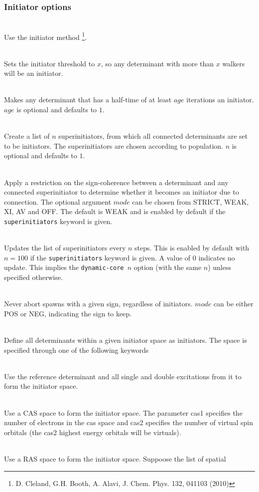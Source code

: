 \documentclass[a4paper,notitlepage]{scrreprt}
\newcommand\codeitem[1]{\needspace{1.5\baselineskip}\item[\textnormal{\ttfamily #1 \nopagebreak}] \hfill \\ \nopagebreak}
\begin{document}
  \subsubsection{Initiator options}
  \begin{description}
    \codeitem{truncinitiator}
    Use the initiator method \footnote{D. Cleland, G.H. Booth, A. Alavi,
      J. Chem. Phys. 132, 041103 (2010)}.
    \codeitem{addtoinitiator $x$}
    Sets the initiator threshold to $x$, so any determinant with more than $x$
    walkers will be an initiator.
    \codeitem{senior-initiators $age$}
    Makes any determinant that has a half-time of at least $age$ iterations an
    initiator. $age$ is optional and defaults to $1$.
    \codeitem{superinitiator $n$}
    Create a list of $n$ superinitiators, from which all connected
    determinants are set to be initiators. The superinitiators are chosen
    according to population. $n$ is optional and defaults to $1$. 
    \codeitem{coherent-superinitiators $mode$}
    Apply a restriction on the sign-coherence between a determinant and any
    connected superinitiator to determine whether it becomes an initiator due
    to connection. The optional argument $mode$ can be chosen from STRICT,
    WEAK, XI, AV and OFF. The default is WEAK and is enabled by default if the
    \texttt{superinitiators} keyword is given.
    \codeitem{dynamic-superinitiators $n$}
    Updates the list of superinitiators every $n$ steps. This is enabled by default with
    $n=100$ if the \texttt{superinitiators} keyword is given. A value of 0
    indicates no update. This implies the \texttt{dynamic-core $n$} option
    (with the same $n$) unless specified otherwise.
    \codeitem{allow-signed-spawns $mode$}
    Never abort spawns with a given sign, regardless of initiators. $mode$ can
    be either POS or NEG, indicating the sign to keep.
    \codeitem{initiator-space}
    Define all determinants within a given initiator space as initiators. The
    space is specified through one of the following keywords
    \begin{description}
      \codeitem{doubles-initiator}
    Use the reference determinant and all single and double excitations
    from it to form the initiator space.
    \codeitem{cas-initiator cas1 cas2}
    Use a CAS space to form the initiator space. The parameter cas1 specifies
    the number of electrons in the cas space and cas2 specifies the
    number of virtual spin orbitals (the cas2 highest energy orbitals
    will be virtuals).
    \codeitem{ras-initiator ras1 ras2 ras3 ras4 ras5}
    Use a RAS space to form the initiator space. Suppoose the list of spatial

\end{description}
\end{description}
\end{document}
